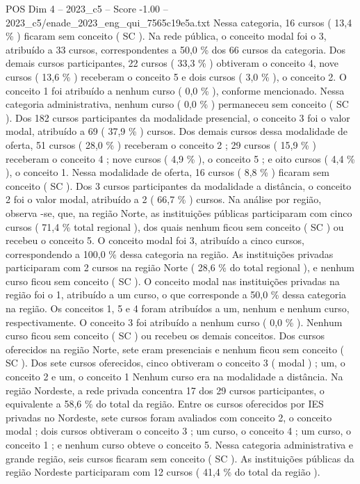 \begin{textsample}{POS Dim 4 – 2023\_c5 – Score -1.00 – 2023\_c5/enade\_2023\_eng\_qui\_7565c19e5a.txt}
Nessa categoria, 16 cursos ( 13,4 \% ) ficaram sem conceito ( SC ).
Na rede pública, o conceito modal foi o 3, atribuído a 33 cursos, correspondentes a 50,0 \% dos 66 cursos da categoria.
Dos demais cursos participantes, 22 cursos ( 33,3 \% ) obtiveram o conceito 4, nove cursos ( 13,6 \% ) receberam o conceito 5 e dois cursos ( 3,0 \% ), o conceito 2.
O conceito 1 foi atribuído a nenhum curso ( 0,0 \% ), conforme mencionado.
Nessa categoria administrativa, nenhum curso ( 0,0 \% ) permaneceu sem conceito ( SC ).
Dos 182 cursos participantes da modalidade presencial, o conceito 3 foi o valor modal, atribuído a 69 ( 37,9 \% ) cursos.
Dos demais cursos dessa modalidade de oferta, 51 cursos ( 28,0 \% ) receberam o conceito 2 ; 29 cursos ( 15,9 \% ) receberam o conceito 4 ; nove cursos ( 4,9 \% ), o conceito 5 ; e oito cursos ( 4,4 \% ), o conceito 1.
Nessa modalidade de oferta, 16 cursos ( 8,8 \% ) ficaram sem conceito ( SC ).
Dos 3 cursos participantes da modalidade a distância, o conceito 2 foi o valor modal, atribuído a 2 ( 66,7 \% ) cursos.
Na análise por região, observa -se, que, na região Norte, as instituições públicas participaram com cinco cursos ( 71,4 \% total regional ), dos quais nenhum ficou sem conceito ( SC ) ou recebeu o conceito 5.
O conceito modal foi 3, atribuído a cinco cursos, correspondendo a 100,0 \% dessa categoria na região.
As instituições privadas participaram com 2 cursos na região Norte ( 28,6 \% do total regional ), e nenhum curso ficou sem conceito ( SC ).
O conceito modal nas instituições privadas na região foi o 1, atribuído a um curso, o que corresponde a 50,0 \% dessa categoria na região.
Os conceitos 1, 5 e 4 foram atribuídos a um, nenhum e nenhum curso, respectivamente.
O conceito 3 foi atribuído a nenhum curso ( 0,0 \% ).
Nenhum curso ficou sem conceito ( SC ) ou recebeu os demais conceitos.
Dos cursos oferecidos na região Norte, sete eram presenciais e nenhum ficou sem conceito ( SC ).
Dos sete cursos oferecidos, cinco obtiveram o conceito 3 ( modal ) ; um, o conceito 2 e um, o conceito 1 Nenhum curso era na modalidade a distância.
Na região Nordeste, a rede privada concentra 17 dos 29 cursos participantes, o equivalente a 58,6 \% do total da região.
Entre os cursos oferecidos por IES privadas no Nordeste, sete cursos foram avaliados com conceito 2, o conceito modal ; dois cursos obtiveram o conceito 3 ; um curso, o conceito 4 ; um curso, o conceito 1 ; e nenhum curso obteve o conceito 5.
Nessa categoria administrativa e grande região, seis cursos ficaram sem conceito ( SC ).
As instituições públicas da região Nordeste participaram com 12 cursos ( 41,4 \% do total da região ).

\end{textsample}
